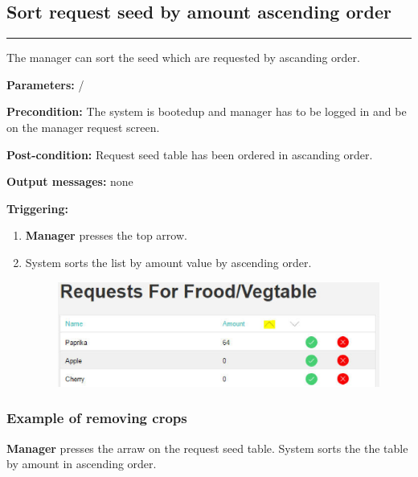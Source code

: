 \break


\subsection{Sort request seed by amount ascending order}

\hrule
\hfill
\vspace{0.5cm}

\label{operation:sortSeedRequest}

The manager can sort the seed which are requested by ascanding order.
\begin{description}

\item \textbf{Parameters:} /
\item \textbf{Precondition:} The system is bootedup and manager has to be
logged in and be on the manager request screen.
\item \textbf{Post-condition:} Request seed table has been ordered in ascanding
order.

\item \textbf{Output messages:} none
\item \textbf{Triggering:}
\begin{enumerate}
\item \textbf{Manager} presses the top arrow.
\item System sorts the list by amount value by ascending order.
\begin{figure}[H]
\includegraphics[width=1\textwidth]{images/RequestByAscendingOrderManager.eps}
\end{figure}
\end{enumerate}
\end{description}

\subsubsection{Example of removing crops}
\textbf{Manager} presses the arraw on the request seed table. System sorts the
the table by amount in ascending order.

